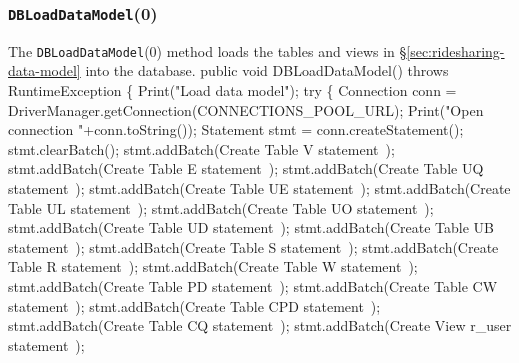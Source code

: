 \documentclass{article}
\theoremstyle{definition}                   %
\begin{document}
\subsubsection{{\tt{}\protect{}DBLoadDataModel}(0)}
The {\tt{}\protect{}DBLoadDataModel}(0) method loads the tables and views in
\S\ref{sec:ridesharing-data-model} into the database.
\nwenddocs{}\endmoddef{}
public void DBLoadDataModel() throws RuntimeException \{
  Print("Load data model");
  try \{
    Connection conn = DriverManager.getConnection(CONNECTIONS_POOL_URL);
    Print("Open connection "+conn.toString());
    Statement stmt = conn.createStatement();
    stmt.clearBatch();
    stmt.addBatch(\LA{}Create Table V statement~{\nwtagstyle{}}\RA{});
    stmt.addBatch(\LA{}Create Table E statement~{\nwtagstyle{}}\RA{});
    stmt.addBatch(\LA{}Create Table UQ statement~{\nwtagstyle{}}\RA{});
    stmt.addBatch(\LA{}Create Table UE statement~{\nwtagstyle{}}\RA{});
    stmt.addBatch(\LA{}Create Table UL statement~{\nwtagstyle{}}\RA{});
    stmt.addBatch(\LA{}Create Table UO statement~{\nwtagstyle{}}\RA{});
    stmt.addBatch(\LA{}Create Table UD statement~{\nwtagstyle{}}\RA{});
    stmt.addBatch(\LA{}Create Table UB statement~{\nwtagstyle{}}\RA{});
    stmt.addBatch(\LA{}Create Table S statement~{\nwtagstyle{}}\RA{});
    stmt.addBatch(\LA{}Create Table R statement~{\nwtagstyle{}}\RA{});
    stmt.addBatch(\LA{}Create Table W statement~{\nwtagstyle{}}\RA{});
    stmt.addBatch(\LA{}Create Table PD statement~{\nwtagstyle{}}\RA{});
    stmt.addBatch(\LA{}Create Table CW statement~{\nwtagstyle{}}\RA{});
    stmt.addBatch(\LA{}Create Table CPD statement~{\nwtagstyle{}}\RA{});
    stmt.addBatch(\LA{}Create Table CQ statement~{\nwtagstyle{}}\RA{});
    stmt.addBatch(\LA{}Create View r\_user statement~{\nwtagstyle{}}\RA{});
\end{document}

